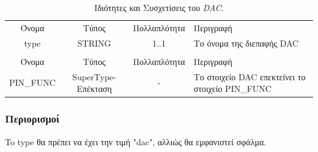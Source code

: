 \begin{table}[H]
	\begin{center}
		\begin{tabular}{ | c | c | c| m{5.5cm} | }
			\hline
			\rowcolor{Gray}
			\multicolumn{4}{|c|}{\textbf{Ιδιότητες}}\\
			\hline
			\rowcolor{Gray}
			Όνομα & Τύπος & Πολλαπλότητα & Περιγραφή \\
			\hline
			type & STRING & 1..1 & Το όνομα της διεπαφής DAC \\
			\hline
			\rowcolor{Gray}
			\multicolumn{4}{|c|}{\textbf{Συσχετίσεις}}\\
			\hline
			\rowcolor{Gray}
			Όνομα & Τύπος & Πολλαπλότητα & Περιγραφή \\
			\hline
			PIN\_FUNC & SuperType-Επέκταση & - &  Το στοιχείο DAC επεκτείνει το στοιχείο PIN\_FUNC \\
			\hline
		\end{tabular}
		\caption{Ιδιότητες και Συσχετίσεις του \textit{DAC}.}
		\label{tab:dac}
	\end{center}
\end{table}

\subsubsection*{Περιορισμοί}

\noindent To type θα πρέπει να έχει την τιμή "dac", αλλιώς θα εμφανιστεί σφάλμα.